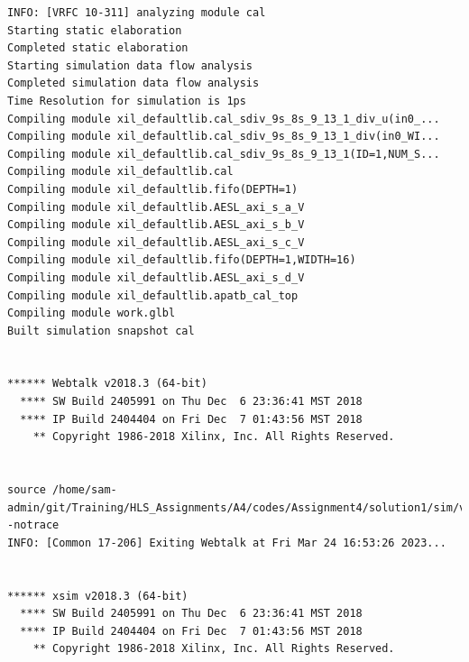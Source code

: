 \documentclass{article}
\begin{document}
\begin{lstlisting}
INFO: [VRFC 10-311] analyzing module cal
Starting static elaboration
Completed static elaboration
Starting simulation data flow analysis
Completed simulation data flow analysis
Time Resolution for simulation is 1ps
Compiling module xil_defaultlib.cal_sdiv_9s_8s_9_13_1_div_u(in0_...
Compiling module xil_defaultlib.cal_sdiv_9s_8s_9_13_1_div(in0_WI...
Compiling module xil_defaultlib.cal_sdiv_9s_8s_9_13_1(ID=1,NUM_S...
Compiling module xil_defaultlib.cal
Compiling module xil_defaultlib.fifo(DEPTH=1)
Compiling module xil_defaultlib.AESL_axi_s_a_V
Compiling module xil_defaultlib.AESL_axi_s_b_V
Compiling module xil_defaultlib.AESL_axi_s_c_V
Compiling module xil_defaultlib.fifo(DEPTH=1,WIDTH=16)
Compiling module xil_defaultlib.AESL_axi_s_d_V
Compiling module xil_defaultlib.apatb_cal_top
Compiling module work.glbl
Built simulation snapshot cal


****** Webtalk v2018.3 (64-bit)
  **** SW Build 2405991 on Thu Dec  6 23:36:41 MST 2018
  **** IP Build 2404404 on Fri Dec  7 01:43:56 MST 2018
    ** Copyright 1986-2018 Xilinx, Inc. All Rights Reserved.


source /home/sam-admin/git/Training/HLS_Assignments/A4/codes/Assignment4/solution1/sim/verilog/xsim.dir/cal/webtalk/xsim_webtalk.tcl -notrace
INFO: [Common 17-206] Exiting Webtalk at Fri Mar 24 16:53:26 2023...


****** xsim v2018.3 (64-bit)
  **** SW Build 2405991 on Thu Dec  6 23:36:41 MST 2018
  **** IP Build 2404404 on Fri Dec  7 01:43:56 MST 2018
    ** Copyright 1986-2018 Xilinx, Inc. All Rights Reserved.



\end{lstlisting}
\end{document}
